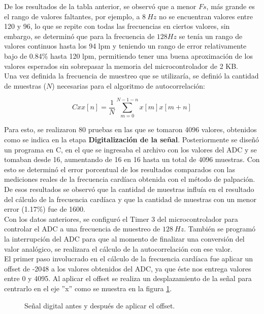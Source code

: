 De los resultados de la tabla anterior, se observó que a menor $Fs$, más grande es el rango de valores faltantes, por ejemplo, a $8\ Hz$ no se encuentran valores entre 120 y 96, lo que se repite con todas las frecuencias en ciertos valores, sin embargo, se determinó que para la frecuencia de $128 Hz$ se tenía un rango de valores continuos hasta los 94 lpm y teniendo un rango de error relativamente bajo de 0.84\% hasta 120 lpm, permitiendo tener una buena aproximación de los valores esperados sin sobrepasar la memoria del microcontrolador de 2 KB. \\

Una vez definida la frecuencia de muestreo que se utilizaría, se definió la cantidad de muestras ($N$) necesarias para el algoritmo de autocorrelación:

$$Cxx[n] = \frac{1}{N} \sum_{m=0}^{N-1-n}x[m]x[m+n]$$

Para esto, se realizaron 80 pruebas en las que se tomaron 4096 valores, obtenidos como se indica en la etapa \textbf{Digitalización de la señal}. Posteriormente se diseñó un programa en C, en el que se ingresaba el archivo con los valores del ADC y se tomaban desde 16, aumentando de 16 en 16 hasta un total de 4096 muestras. Con esto se determinó el error porcentual de los resultados comparados con las mediciones reales de la frecuencia cardíaca obtenida con el método de palpación. \\

De esos resultados se observó que la cantidad de muestras influía en el resultado del cálculo de la frecuencia cardíaca y que la cantidad de muestras con un menor error (1.17\%) fue de 1600. \\

Con los datos anteriores, se configuró el Timer 3 del microcontrolador para controlar el ADC a una frecuencia de muestreo de $128\ Hz$. También se programó la interrupción del ADC para que al momento de finalizar una conversión del valor analógico, se realizara el cálculo de la autocorrelación con ese valor. \\

El primer paso involucrado en el cálculo de la frecuencia cardíaca fue aplicar un offset de -2048 a los valores obtenidos del ADC, ya que éste nos entrega valores entre 0 y 4095. Al aplicar el offset se realiza un desplazamiento de la señal para centrarlo en el eje ''x'' como se muestra en la figura \ref{fig:offset}. \\

\begin{figure}[htbp!]
	\centering
	\caption{Señal digital antes y después de aplicar el offset.}
	\label{fig:offset}
\end{figure}

